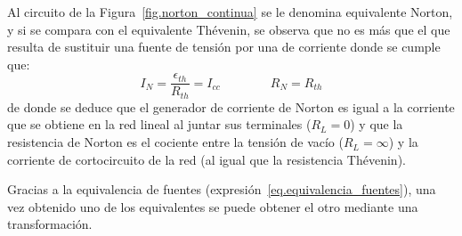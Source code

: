 Al circuito de la Figura~\ref{fig.norton_continua} se le denomina equivalente Norton, y si se compara con el equivalente Thévenin, se observa que no es más que el que resulta de sustituir una fuente de tensión por una de corriente donde se cumple que: 
\begin{equation}
    \boxed{I_N=\dfrac{\epsilon_{th}}{R_{th}}= I_{cc}} \qquad\qquad \boxed{R_N=R_{th}}
\end{equation}
de donde se deduce que el generador de corriente de Norton es igual a la corriente que se obtiene en la red lineal al juntar sus terminales ($R_L=0$) y que la resistencia de Norton es el cociente entre la tensión de vacío ($R_L=\infty$) y la corriente de cortocircuito de la red (al igual que la resistencia Thévenin).
\begin{remark}
    Gracias a la equivalencia de fuentes (expresión~\eqref{eq.equivalencia_fuentes}), una vez obtenido uno de los equivalentes se puede obtener el otro mediante una transformación.
\end{remark}

